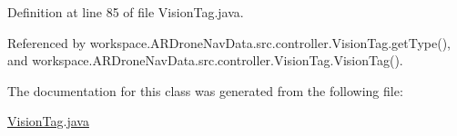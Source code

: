 Definition at line 85 of file Vision\+Tag.\+java.



Referenced by workspace.\+A\+R\+Drone\+Nav\+Data.\+src.\+controller.\+Vision\+Tag.\+get\+Type(), and workspace.\+A\+R\+Drone\+Nav\+Data.\+src.\+controller.\+Vision\+Tag.\+Vision\+Tag().



The documentation for this class was generated from the following file\+:\begin{DoxyCompactItemize}
\item 
\hyperlink{_vision_tag_8java}{Vision\+Tag.\+java}\end{DoxyCompactItemize}
